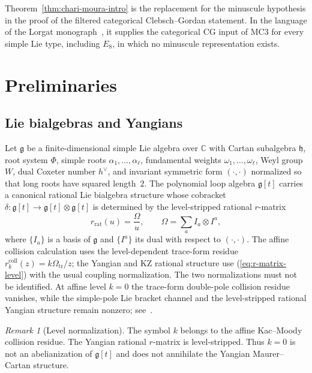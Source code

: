 \documentclass[11pt,reqno]{amsart}
\theoremstyle{definition}
\theoremstyle{remark}
\newtheorem{remark}[theorem]{Remark}
\newcommand{\fg}{\mathfrak{g}}
\newcommand{\fh}{\mathfrak{h}}
\newcommand{\Omg}{\Omega}
\numberwithin{equation}{section}
\begin{document}
Theorem~\ref{thm:chari-moura-intro} is the replacement for the
minuscule hypothesis in the proof of the filtered categorical
Clebsch--Gordan statement. In the language of the Lorgat
monograph~\cite{LorgatMKD}, it supplies the categorical CG input
of MC3 for every simple Lie type, including $E_8$, in which no
minuscule representation exists.

\section{Preliminaries}\label{sec:prelim}

\subsection{Lie bialgebras and Yangians}

Let $\fg$ be a finite-dimensional simple Lie algebra over
$\mathbb{C}$ with Cartan subalgebra $\fh$, root system $\Phi$,
simple roots $\alpha_1, \ldots, \alpha_\ell$, fundamental weights
$\omega_1, \ldots, \omega_\ell$, Weyl group $W$, dual Coxeter
number $h^\vee$, and invariant symmetric form $(\cdot,\cdot)$
normalized so that long roots have squared length~$2$.
The polynomial loop algebra $\fg[t]$ carries a canonical rational
Lie bialgebra structure whose cobracket
$\delta: \fg[t] \to \fg[t] \otimes \fg[t]$ is determined by the
level-stripped rational $r$-matrix
\begin{equation}\label{eq:r-matrix-level}
r_{\mathrm{rat}}(u) = \frac{\Omg}{u},
\qquad
\Omg = \sum_a I_a \otimes I^a,
\end{equation}
where $\{I_a\}$ is a basis of $\fg$ and $\{I^a\}$ its dual with
respect to $(\cdot, \cdot)$. The affine collision calculation uses
the level-dependent trace-form residue
$r^{\mathrm{coll}}_k(z)=k\Omega_{\mathrm{tr}}/z$; the Yangian
and KZ rational structure use (\ref{eq:r-matrix-level}) with the
usual coupling normalization. The two normalizations must not be
identified. At affine level $k=0$ the trace-form double-pole
collision residue vanishes, while the simple-pole Lie bracket
channel and the level-stripped rational Yangian structure remain
nonzero; see~\cite{LorgatMKD}.

\begin{remark}[Level normalization]
\label{rem:level-norm}
The symbol $k$ belongs to the affine Kac--Moody collision residue.
The Yangian rational $r$-matrix is level-stripped. Thus $k=0$ is
not an abelianization of $\fg[t]$ and does not annihilate the
Yangian Maurer--Cartan structure.
\end{remark}
\end{document}
